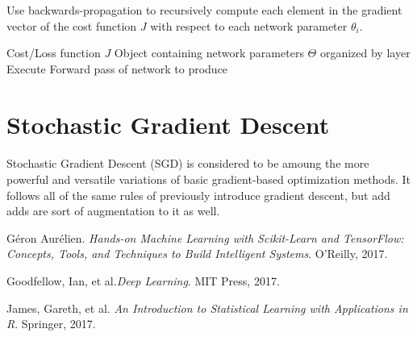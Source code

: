 \documentclass[12pt,letterpaper]{article}
\begin{document}
\begin{algorithm}
\caption{Use backwards-propagation to recursively compute each element in the gradient vector of the cost function $J$ with respect to each network parameter $\theta_i$.}
\begin{algorithmic}
\REQUIRE Cost/Loss function $J$
\REQUIRE Object containing network parameters $\Theta$ organized by layer
Execute Forward pass of network to produce


\end{algorithmic}
\end{algorithm}






\section{Stochastic Gradient Descent}

\paragraph*{}Stochastic Gradient Descent (SGD) is considered to be amoung the more powerful and versatile variations of basic gradient-based optimization methods. It follows all of the same rules of previously introduce gradient descent, but add adds are sort of augmentation to it as well.





\begin{thebibliography}{9}


Géron Aurélien. \textit{Hands-on Machine Learning with Scikit-Learn and TensorFlow: Concepts, Tools, and Techniques to Build Intelligent Systems}. O'Reilly, 2017.

Goodfellow, Ian, et al.\textit{Deep Learning}. MIT Press, 2017.

James, Gareth, et al. \textit{An Introduction to Statistical Learning with Applications in R}. Springer, 2017.


\end{thebibliography}


\end{document}
